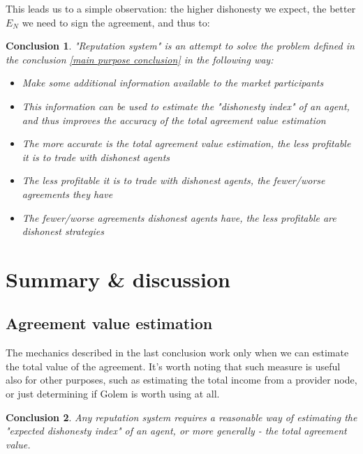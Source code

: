 \documentclass{article}
\newtheorem{conclusion}{Conclusion}[section]
\begin{document}
This leads us to a simple observation: the higher dishonesty we expect, the better $E_N$ we need to sign the agreement, and thus to:

\begin{conclusion}

"Reputation system" is an attempt to solve the problem defined in the conclusion \ref{main purpose conclusion} in the following way:

\begin{itemize}
    \item Make some additional information available to the market participants
    \item This information can be used to estimate the "dishonesty index" of an agent, and thus improves the accuracy of the total agreement value estimation
    \item The more accurate is the total agreement value estimation, the less profitable it is to trade with dishonest agents
    \item The less profitable it is to trade with dishonest agents, the fewer/worse agreements they have
    \item The fewer/worse agreements dishonest agents have, the less profitable are dishonest strategies
\end{itemize}

\end{conclusion}


\section{Summary \& discussion}

\subsection{Agreement value estimation}
The mechanics described in the last conclusion work only when we can estimate the total value of the agreement.
It's worth noting that such measure is useful also for other purposes, such as estimating the total income from a provider node,
or just determining if Golem is worth using at all.

\begin{conclusion}

Any reputation system requires a reasonable way of estimating the "expected dishonesty index" of an agent, 
or more generally - the total agreement value.

\label{agreement value estimation}
\end{conclusion}
\end{document}
